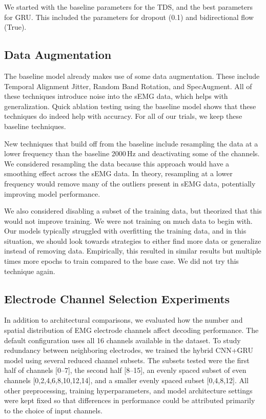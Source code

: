 \documentclass{article}
\begin{document}
We started with the baseline parameters for the TDS, and the best parameters for GRU\@.
This included the parameters for dropout (0.1) and bidirectional flow (True).

\subsection{Data Augmentation}

The baseline model already makes use of some data augmentation.
These include Temporal Alignment Jitter, Random Band Rotation, and SpecAugment.
All of these techniques introduce noise into the sEMG data, which helps with generalization.
Quick ablation testing using the baseline model shows that these techniques do indeed
help with accuracy.
For all of our trials, we keep these baseline techniques.

New techniques that build off from the baseline include resampling the data at a lower
frequency than the baseline 2000\,Hz and deactivating some of the channels.
We considered resampling the data because this approach would have a smoothing effect
across the sEMG data.
In theory, resampling at a lower frequency would remove many of the outliers present
in sEMG data, potentially improving model performance.

We also considered disabling a subset of the training data, but theorized that this
would not improve training.
We were not training on much data to begin with.
Our models typically struggled with overfitting the training data, and in this situation,
we should look towards strategies to either find more data or generalize instead of
removing data.
Empirically, this resulted in similar results but multiple times more epochs to train
compared to the base case.
We did not try this technique again.

\subsection{Electrode Channel Selection Experiments}

In addition to architectural comparisons, we evaluated how the number and spatial
distribution of EMG electrode channels affect decoding performance. The default
configuration uses all 16 channels available in the dataset. To study redundancy
between neighboring electrodes, we trained the hybrid CNN+GRU model using several
reduced channel subsets. The subsets tested were the first half of channels [0--7],
the second half [8--15], an evenly spaced subset of even channels [0,2,4,6,8,10,12,14],
and a smaller evenly spaced subset [0,4,8,12]. All other preprocessing, training
hyperparameters, and model architecture settings were kept fixed so that differences
in performance could be attributed primarily to the choice of input channels.
\end{document}
